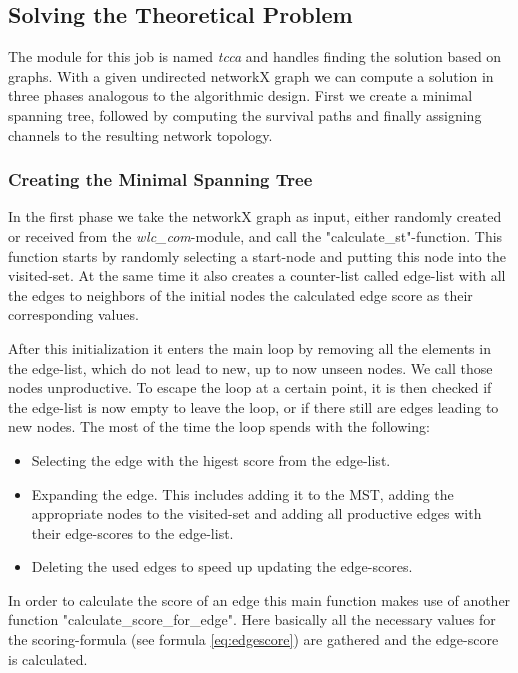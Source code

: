       \clearpage
      \newpage
      
    \subsection{Solving the Theoretical Problem}
      The module for this job is named \textit{tcca} and handles finding the solution based on graphs.
      With a given undirected networkX graph we can compute a solution in three phases analogous to the algorithmic design.
      First we create a minimal spanning tree, followed by computing the survival paths and finally assigning channels to the resulting network topology.

      \subsubsection{Creating the Minimal Spanning Tree}
	In the first phase we take the networkX graph as input, either randomly created or received from the \textit{wlc\_com}-module, and call the "calculate\_st"-function.
	This function starts by randomly selecting a start-node and putting this node into the visited-set. 
	At the same time it also creates a counter-list called edge-list with all the edges to neighbors 
	of the initial nodes the calculated edge score as their corresponding values.
	
	After this initialization it enters the main loop by removing all the elements in the edge-list, which do not lead to new, up to now unseen nodes. 
	We call those nodes unproductive.
	To escape the loop at a certain point, it is then checked if the edge-list is now empty to leave the loop, or if there still are edges leading to new nodes.
	The most of the time the loop spends with the following:
	
	\begin{itemize}
	 \item Selecting the edge with the higest score from the edge-list.
	 
	 \item Expanding the edge. This includes adding it to the \ac{MST}, adding the appropriate nodes to the visited-set and 
	  adding all productive edges with their edge-scores to the edge-list.
	 
	 \item Deleting the used edges to speed up updating the edge-scores.
	\end{itemize}
	
	In order to calculate the score of an edge this main function makes use of another function "calculate\_score\_for\_edge".
	Here basically all the necessary values for the scoring-formula (see formula \ref{eq:edgescore}) are gathered and the edge-score is calculated.
	
